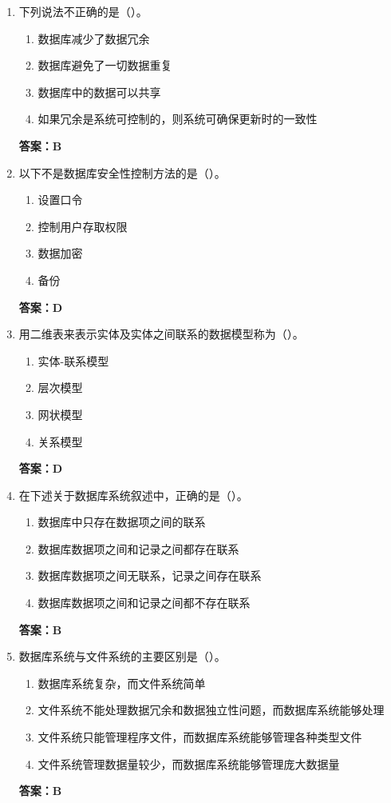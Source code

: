 \documentclass[12pt, a4paper]{article}
\begin{document}
\begin{enumerate}[label=\arabic*.]
	\item 下列说法不正确的是（\quad）。
	      \begin{enumerate}
		      \item 数据库减少了数据冗余
		      \item 数据库避免了一切数据重复
		      \item 数据库中的数据可以共享
		      \item 如果冗余是系统可控制的，则系统可确保更新时的一致性
	      \end{enumerate}
	      \textbf{答案：B}

	\item 以下不是数据库安全性控制方法的是（\quad）。
	      \begin{enumerate}
		      \item 设置口令
		      \item 控制用户存取权限
		      \item 数据加密
		      \item 备份
	      \end{enumerate}
	      \textbf{答案：D}

	\item 用二维表来表示实体及实体之间联系的数据模型称为（\quad）。
	      \begin{enumerate}
		      \item 实体-联系模型
		      \item 层次模型
		      \item 网状模型
		      \item 关系模型
	      \end{enumerate}
	      \textbf{答案：D}

	\item 在下述关于数据库系统叙述中，正确的是（\quad）。
	      \begin{enumerate}
		      \item 数据库中只存在数据项之间的联系
		      \item 数据库数据项之间和记录之间都存在联系
		      \item 数据库数据项之间无联系，记录之间存在联系
		      \item 数据库数据项之间和记录之间都不存在联系
	      \end{enumerate}
	      \textbf{答案：B}

	\item 数据库系统与文件系统的主要区别是（\quad）。
	      \begin{enumerate}
		      \item 数据库系统复杂，而文件系统简单
		      \item 文件系统不能处理数据冗余和数据独立性问题，而数据库系统能够处理
		      \item 文件系统只能管理程序文件，而数据库系统能够管理各种类型文件
		      \item 文件系统管理数据量较少，而数据库系统能够管理庞大数据量
	      \end{enumerate}
	      \textbf{答案：B}


\end{enumerate}
\end{document}
